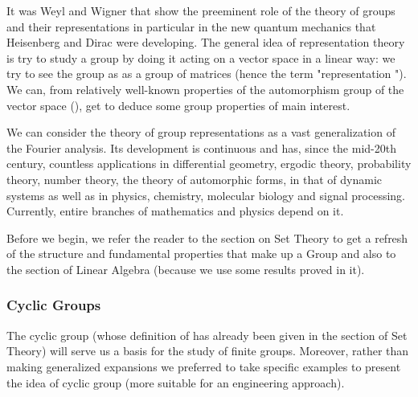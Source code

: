 	It was Weyl and Wigner that show the preeminent role of the theory of groups and their representations in particular in the new quantum mechanics that Heisenberg  and Dirac were developing. The general idea of representation theory is try to study a group by doing it acting on a vector space in a linear way: we try to see the group as as a group of matrices (hence the term "representation "). We can, from relatively well-known properties of the automorphism group of the vector space (), get to deduce some group properties of main interest.
	
	We can consider the theory of group representations as a vast generalization of the Fourier analysis. Its development is continuous and has, since the mid-20th century, countless applications in differential geometry, ergodic theory, probability theory, number theory, the theory of automorphic forms, in that of dynamic systems as well as in physics, chemistry, molecular biology and signal processing. Currently, entire branches of mathematics and physics depend on it.
	
	Before we begin, we refer the reader to the section on Set Theory to get a refresh of the structure and fundamental properties that make up a Group and also to the section of Linear Algebra (because we use some results proved in it).
	
	\subsubsection{Cyclic Groups}
	The cyclic group (whose definition of has already been given in the section of Set Theory) will serve us a basis for the study of finite groups. Moreover, rather than making generalized expansions we preferred to take specific examples to present the idea of cyclic group (more suitable for an engineering approach).
	
